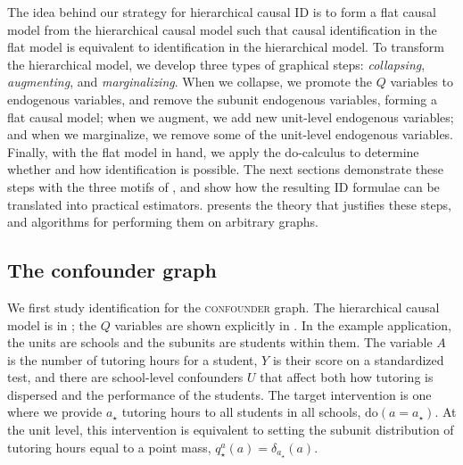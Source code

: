 \documentclass[12pt]{article}
\newcommand{\rmdo}{\mathrm{do}}
\begin{document}
The idea behind our strategy for hierarchical causal ID is to form a
flat causal model from the hierarchical causal model such that causal
identification in the flat model is equivalent to identification in
the hierarchical model. To transform the hierarchical model, we
develop three types of graphical steps: \textit{collapsing},
\textit{augmenting}, and \textit{marginalizing}. When we collapse, we promote
the $Q$ variables to endogenous variables, and remove the subunit
endogenous variables, forming a flat causal model; when we augment, we add new unit-level
endogenous variables; and when we marginalize, we remove some of the
unit-level endogenous variables. Finally, with the flat model in hand,
we apply the do-calculus to determine whether and how identification
is possible. The next sections demonstrate these steps with the three
motifs of , and show how the resulting ID formulae can be translated into practical estimators.   presents the
theory that justifies these steps, and algorithms for performing them
on arbitrary graphs.

\subsection{The confounder graph}
\label{sec:confounder_id}


We first study identification for the \textsc{confounder} graph. The
hierarchical causal model is in ; the
$Q$ variables are shown explicitly in
. In the example application, the units are
schools and the subunits are students within them. The variable $A$ is
the number of tutoring hours for a student, $Y$ is their score on a
standardized test, and there are school-level confounders $U$ that
affect both how tutoring is dispersed and the performance of the
students. The target intervention is one where we provide $a_\star$
tutoring hours to all students in all schools, $\rmdo(a =
a_\star)$. At the unit level, this intervention is equivalent to
setting the subunit distribution of tutoring hours equal to a point
mass, $q^{a}_\star(a) = \delta_{a_\star}(a)$.
\end{document}
